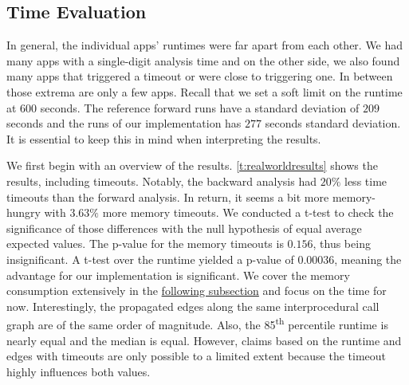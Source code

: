 \documentclass[../draft.tex]{subfiles}
\begin{document}
    \FloatBarrier
    \subsection{Time Evaluation}
    In general, the individual apps' runtimes were far apart from each other.
    We had many apps with a single-digit analysis time and on the other side, we also found many apps that triggered a timeout or were close to triggering one.
    In between those extrema are only a few apps.
    Recall that we set a soft limit on the runtime at 600 seconds.
    The reference forward runs have a standard deviation of $209$ seconds and the runs of our implementation has $277$ seconds standard deviation.
    It is essential to keep this in mind when interpreting the results.

    We first begin with an overview of the results.
    \autoref{t:realworldresults} shows the results, including timeouts.
    Notably, the backward analysis had $20\%$ less time timeouts than the forward analysis.
    In return, it seems a bit more memory-hungry with $3.63\%$ more memory timeouts.
    We conducted a t-test to check the significance of those differences with the null hypothesis of equal average expected values.
    The p-value for the memory timeouts is $0.156$, thus being insignificant.
    A t-test over the runtime yielded a p-value of $0.00036$, meaning the advantage for our implementation is significant.
    We cover the memory consumption extensively in the \hyperref[s:memex]{following subsection} and focus on the time for now.
    Interestingly, the propagated edges along the same interprocedural call graph are of the same order of magnitude.
    Also, the 85\textsuperscript{th} percentile runtime is nearly equal and the median is equal.
    However, claims based on the runtime and edges with timeouts are only possible to a limited extent because the timeout highly influences both values.
\end{document}
